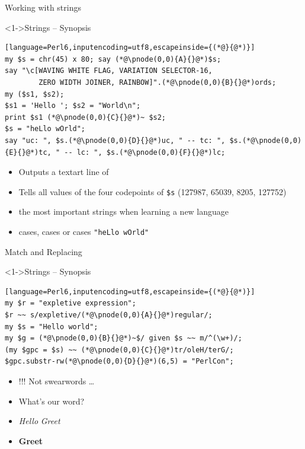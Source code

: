 \begin{frame}[fragile]{Working with strings}
\begin{block}<1->{Strings -- Synopsis}
\small
\begin{lstlisting}[language=Perl6,inputencoding=utf8,escapeinside={(*@}{@*)}]
my $s = chr(45) x 80; say (*@\pnode(0,0){A}{}@*)$s;
say "\c[WAVING WHITE FLAG, VARIATION SELECTOR-16,
        ZERO WIDTH JOINER, RAINBOW]".(*@\pnode(0,0){B}{}@*)ords;
my ($s1, $s2);
$s1 = 'Hello '; $s2 = "World\n";
print $s1 (*@\pnode(0,0){C}{}@*)~ $s2;
$s = "heLlo wOrld";
say "uc: ", $s.(*@\pnode(0,0){D}{}@*)uc, " -- tc: ", $s.(*@\pnode(0,0){E}{}@*)tc, " -- lc: ", $s.(*@\pnode(0,0){F}{}@*)lc;
\end{lstlisting}
\end{block}

\begin{itemize}
\item<2-> Outputs a textart line of \texttt{}
\item<3-> Tells all  values of the four codepoints of \texttt{\$s} (127987, 65039, 8205, 127752) %
\item<4->  the most important strings when learning a new language
\item<5->  cases,  cases or  cases \lstinline[language=Perl6,inputencoding=latin9]!"heLlo wOrld"!
\end{itemize}
\end{frame}

\begin{frame}[fragile]{Match and Replacing}
\begin{block}<1->{Strings -- Synopsis}
\small
\begin{lstlisting}[language=Perl6,inputencoding=utf8,escapeinside={(*@}{@*)}]
my $r = "expletive expression";
$r ~~ s/expletive/(*@\pnode(0,0){A}{}@*)regular/;
my $s = "Hello world";
my $g = (*@\pnode(0,0){B}{}@*)~$/ given $s ~~ m/^(\w+)/;
(my $gpc = $s) ~~ (*@\pnode(0,0){C}{}@*)tr/oleH/terG/;
$gpc.substr-rw(*@\pnode(0,0){D}{}@*)(6,5) = "PerlCon";
\end{lstlisting}
\end{block}

\begin{itemize}
\item<2-> !!! Not swearwords \ldots
\item<3-> What's our  word?
\item<4-> \textit{Hello}  \textit{Greet}
\item<5-> \textbf{Greet } 
\end{itemize}
\end{frame}

